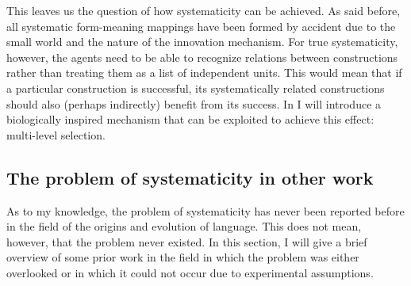This leaves us the question of how systematicity can be achieved. As said before, all systematic form-meaning mappings have been formed by accident due to the small world and the nature of the innovation mechanism. For true systematicity, however, the agents need to be able to recognize relations between constructions rather than treating them as a list of independent units. This would mean that if a particular construction is successful, its systematically related constructions should also (perhaps indirectly) benefit from its success. In  I will introduce a biologically inspired mechanism that can be exploited to achieve this effect: multi-level selection.

\subsection{The problem of systematicity in other work}
\label{s:problem-systematicity}

As to my knowledge, the problem of systematicity has never been reported before in the field of the origins and evolution of language. This does not mean, however, that the problem never existed. In this section, I will give a brief overview of some prior work in the field in which the problem was either overlooked or in which it could not occur due to experimental assumptions.


